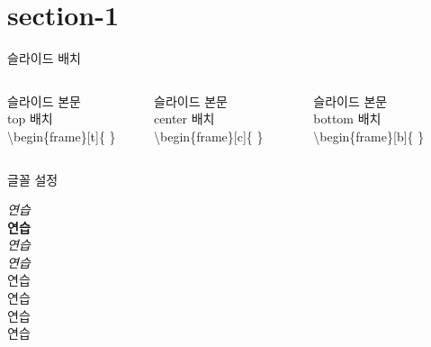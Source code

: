 \documentclass[10pt,blue,xcolor=pdftex,dvipsnames,table,handout]{beamer}
\begin{document}
		\section{section-1}
		\begin{frame}[t]{슬라이드 배치}
		\begin{columns}

			\begin{column}{.3\textwidth}
				\begin{block} {슬라이드 본문\\ top 배치}
				\textbackslash begin\{frame\}[t]\{ \}
				\end{block}
			\end{column}

			\begin{column}{.3\textwidth}
				\begin{block} {슬라이드 본문\\ center 배치}
				\textbackslash begin\{frame\}[c]\{ \}
				\end{block}
			\end{column}

			\begin{column}{.31\textwidth}
				\begin{block} {슬라이드 본문\\ bottom 배치}
				\textbackslash begin\{frame\}[b]\{ \}
				\end{block}
			\end{column}

		\end{columns}
		\end{frame}



		\begin{frame}[t]{글꼴 설정}

			\emph{연습} \\
			\textbf{연습} \\
			\textit{연습} \\
			\textsl{연습} \\

			\alert{연습}\\ 
			\textrm{연습}\\ 
			\textsf{연습}\\ 
			\color{green}연습 \\


		\end{frame}
\end{document}
